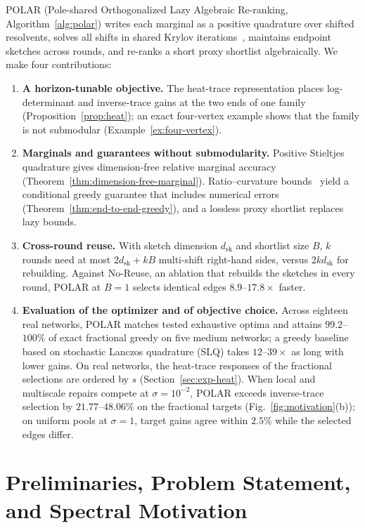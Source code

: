 \documentclass[conference]{IEEEtran}
\theoremstyle{definition}
\newcommand{\POLAR}{\textsc{POLAR}}
\newcommand{\dsk}{d_{\mathrm{sk}}}
\begin{document}
\POLAR{} (Pole-shared Orthogonalized Lazy Algebraic Re-ranking,
Algorithm~\ref{alg:polar}) writes each marginal as a positive
quadrature over shifted resolvents, solves all shifts in shared Krylov
iterations~\cite{jegerlehner1996}, maintains endpoint sketches across
rounds, and re-ranks a short proxy shortlist algebraically.
We make four contributions:
\begin{enumerate}
\item \textbf{A horizon-tunable objective.}
The heat-trace representation places log-determinant and inverse-trace
gains at the two ends of one family (Proposition~\ref{prop:heat}); an
exact four-vertex example shows that the family is not submodular
(Example~\ref{ex:four-vertex}).
\item \textbf{Marginals and guarantees without submodularity.}
Positive Stieltjes quadrature gives dimension-free relative marginal
accuracy (Theorem~\ref{thm:dimension-free-marginal}). Ratio--curvature
bounds~\cite{bian2017} yield a conditional greedy guarantee that
includes numerical errors (Theorem~\ref{thm:end-to-end-greedy}), and a
lossless proxy shortlist replaces lazy bounds.
\item \textbf{Cross-round reuse.}
With sketch dimension $\dsk$ and shortlist size $B$, $k$ rounds need at
most $2\dsk+kB$ multi-shift right-hand sides, versus $2k\dsk$ for
rebuilding. Against No-Reuse, an ablation that rebuilds the sketches in
every round, \POLAR{} at $B=1$ selects identical edges
$8.9$--$17.8\times$ faster.
\item \textbf{Evaluation of the optimizer and of objective choice.}
Across eighteen real networks, \POLAR{} matches tested exhaustive
optima and attains $99.2$--$100\%$ of exact fractional greedy on
five medium networks; a greedy baseline based on stochastic Lanczos
quadrature (SLQ) takes $12$--$39\times$ as long with lower gains.
On real networks, the heat-trace responses of the fractional
selections are ordered by $s$ (Section~\ref{sec:exp-heat}). When local
and multiscale repairs compete at $\sigma=10^{-2}$, \POLAR{} exceeds
inverse-trace selection by $21.77$--$48.06\%$ on the fractional targets
(Fig.~\ref{fig:motivation}(b)); on uniform pools at $\sigma=1$, target
gains agree within $2.5\%$ while the selected edges differ.
\end{enumerate}

\section{Preliminaries, Problem Statement, and Spectral Motivation}
\label{sec:preliminaries}
\end{document}
